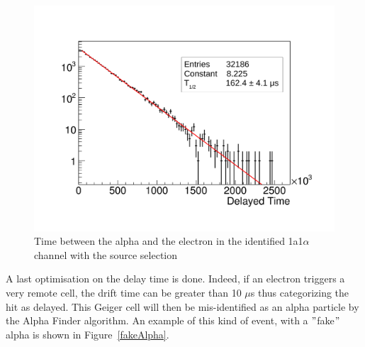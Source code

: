\documentclass[main.tex]{subfiles}
\begin{document}
\begin{figure}[h!]
\begin{center}
\includegraphics[scale=0.33]{pictures/Chap5/delayedtime.pdf}
\caption{Time between the alpha and the electron in the identified 1a1$\alpha$ channel with the source selection}
\label{delayedtimetopology}
\end{center}
\end{figure}


\bigskip


\noindent A last optimisation on the delay time is done. Indeed, if an electron triggers a very remote cell, the drift time can be greater than 10 $\mu$s thus categorizing the hit as delayed. This Geiger cell will then be mis-identified as an alpha particle by the Alpha Finder algorithm. An example of this kind of event, with a $"$fake$"$ alpha is shown in Figure~\ref{fakeAlpha}.
\end{document}
